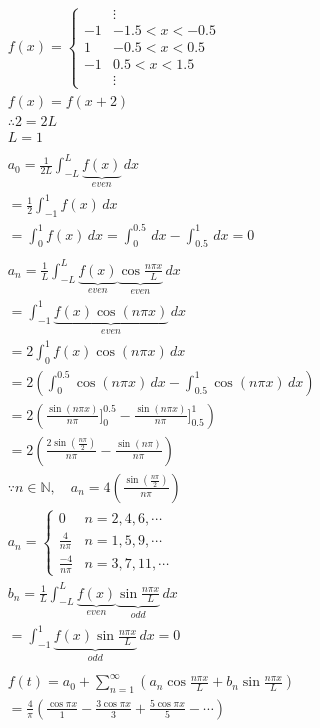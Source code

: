 \documentclass[letterpaper, 12pt]{article}
\begin{document}
\begingroup
\allowdisplaybreaks
\begin{align*}
     & f(x) = \begin{cases}
                     & \vdots          \\
                  -1 & -1.5 < x < -0.5 \\
                  1  & -0.5 < x < 0.5  \\
                  -1 & 0.5 < x < 1.5   \\
                     & \vdots
              \end{cases}
    \\
     & f(x) = f(x + 2)
    \\
     & \therefore 2 = 2L
    \\
     & L = 1
    \\
    \\
     & a_0 = \frac{1}{2L} \int_{-L}^{L} \underbrace{f(x)}_{even} \,dx
    \\
     & = \frac{1}{2} \int_{-1}^{1} f(x) \,dx
    \\
     & = \int_{0}^{1} f(x) \,dx = \int_{0}^{0.5} \,dx - \int_{0.5}^{1} \,dx = 0
    \\
    \\
     & a_n = \frac{1}{L} \int_{-L}^{L} \underbrace{f(x)}_{even} \underbrace{\cos \frac{n\pi x}{L}}_{even} \,dx
    \\
     & = \int_{-1}^{1} \underbrace{f(x) \cos (n\pi x)}_{even} \,dx
    \\
     & = 2\int_{0}^{1} f(x) \cos (n\pi x) \,dx
    \\
     & = 2\left( \int_{0}^{0.5} \cos (n\pi x) \,dx - \int_{0.5}^{1} \cos (n\pi x) \,dx \right)
    \\
     & = 2\left( \frac{\sin (n\pi x)}{n\pi}\Big]_0^{0.5} - \frac{\sin (n\pi x)}{n\pi}\Big]_{0.5}^{1} \right)
    \\
     & = 2\left( \frac{2\sin \left( \frac{n\pi}{2} \right)}{n\pi} - \frac{\sin (n\pi)}{n\pi} \right)
    \\
     & \because n\in \mathbb{N},\quad a_n = 4\left( \frac{\sin (\frac{n\pi}{2})}{n\pi} \right)
    \\
     & a_n = \begin{cases}
                 0               & n = 2, 4, 6, \cdots
                 \\
                 \frac{4}{n\pi}  & n = 1, 5, 9, \cdots
                 \\
                 \frac{-4}{n\pi} & n = 3, 7, 11, \cdots
             \end{cases}
    \\
     & b_n = \frac{1}{L} \int_{-L}^{L} \underbrace{f(x)}_{even} \underbrace{\sin \frac{n\pi x}{L}}_{odd} \,dx
    \\
     & = \int_{-1}^{1} \underbrace{f(x) \sin \frac{n\pi x}{L}}_{odd} \,dx = 0
    \\
    \\
     & f(t) = a_0 + \sum_{n=1}^{\infty} (a_n \cos \frac{n\pi x}{L} + b_n \sin \frac{n\pi x}{L})
    \\
     & = \frac{4}{\pi}\left( \frac{\cos \pi x}{1} - \frac{3\cos \pi x}{3} + \frac{5\cos \pi x}{5} - \cdots \right)
\end{align*}
\endgroup
\end{document}
